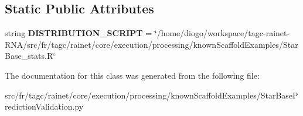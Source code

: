 \subsection*{Static Public Attributes}
\begin{DoxyCompactItemize}
\item 
\hypertarget{classStarBasePredictionValidation_1_1StarBasePredictionValidation_ac4c4250b5353e6d6a50341b773977784}{string {\bfseries D\-I\-S\-T\-R\-I\-B\-U\-T\-I\-O\-N\-\_\-\-S\-C\-R\-I\-P\-T} = \char`\"{}/home/diogo/workspace/tagc-\/rainet-\/R\-N\-A/src/fr/tagc/rainet/core/execution/processing/known\-Scaffold\-Examples/Star\-Base\-\_\-stats.\-R\char`\"{}}\label{classStarBasePredictionValidation_1_1StarBasePredictionValidation_ac4c4250b5353e6d6a50341b773977784}

\end{DoxyCompactItemize}


The documentation for this class was generated from the following file\-:\begin{DoxyCompactItemize}
\item 
src/fr/tagc/rainet/core/execution/processing/known\-Scaffold\-Examples/Star\-Base\-Prediction\-Validation.\-py\end{DoxyCompactItemize}

